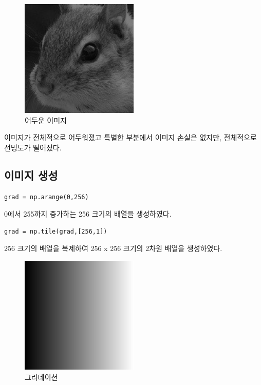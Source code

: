 \documentclass[]{report}
\begin{document}
\begin{figure}[h]
	\centering
	\includegraphics[width=0.5\textwidth]{chipmunk_head_dark.png}
	\caption{어두운 이미지}
\end{figure}

이미지가 전체적으로 어두워졌고 특별한 부분에서 이미지 손실은 없지만, 전체적으로 선명도가 떨어졌다.

\subsection{이미지 생성}

\begin{lstlisting}
grad = np.arange(0,256)
\end{lstlisting}
0에서 255까지 증가하는 256 크기의 배열을 생성하였다.

\begin{lstlisting}
grad = np.tile(grad,[256,1])
\end{lstlisting}
256 크기의 배열을 복제하여 256 x 256 크기의 2차원 배열을 생성하였다.

\begin{figure}[!ht]
	\centering
	\includegraphics[width=0.5\textwidth]{gradient.png}
	\caption{그라데이션}
\end{figure}
\end{document}
